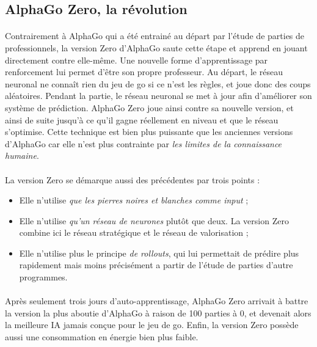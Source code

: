 \subsection*{AlphaGo Zero, la révolution}

\paragraph{} Contrairement à AlphaGo qui a été entrainé au départ par l'étude de parties de professionnels, la version Zero d'AlphaGo saute
cette étape et apprend en jouant directement contre elle-même. Une nouvelle forme \cite{AlphaGo2} d'apprentissage par renforcement lui permet
d'être son propre professeur. Au départ, le réseau neuronal ne connaît rien du jeu de go si ce n'est les règles, et joue donc des coups aléatoires.
Pendant la partie, le réseau neuronal se met à jour afin d'améliorer son système de prédiction. AlphaGo Zero joue ainsi contre sa nouvelle version,
et ainsi de suite jusqu'à ce qu'il gagne réellement en niveau et que le réseau s'optimise. Cette technique est bien plus puissante que les anciennes
versions d'AlphaGo car elle n'est plus contrainte par \emph{les limites de la connaissance humaine}. 

\paragraph{} La version Zero se démarque aussi des précédentes par trois points :

\begin{itemize}
    \item Elle n'utilise \emph{que les pierres noires et blanches comme input} ;
    \item Elle n'utilise \emph{qu'un réseau de neurones} plutôt que deux. La version Zero combine ici le réseau stratégique et le réseau de valorisation ;
    \item Elle n'utilise plus le principe \emph{de rollouts}, qui lui permettait de prédire plus rapidement mais moins précisément a partir de l'étude de parties d'autre programmes.
\end{itemize}

\paragraph{} Après seulement trois jours d'auto-apprentissage, AlphaGo Zero arrivait à battre la version la plus aboutie d'AlphaGo à raison de 100 parties à 0,
et devenait alors la meilleure IA jamais conçue pour le jeu de go. Enfin, la version Zero possède aussi une consommation en énergie bien plus faible.

